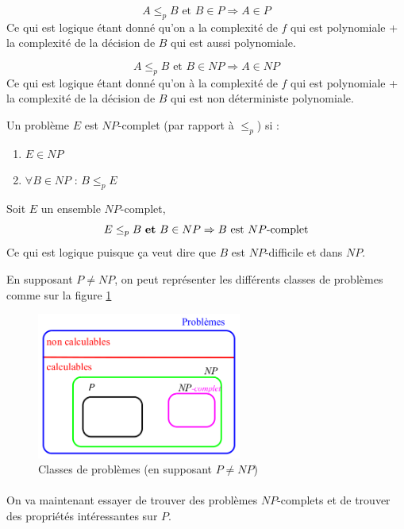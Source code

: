 \begin{myprop}
	\[ A \leq_p B \text{ et } B\in P \Rightarrow A\in P \]
	Ce qui est logique étant donné qu'on a la complexité de $f$ qui est
	polynomiale + la complexité de la décision de $B$ qui est aussi
	polynomiale.
\end{myprop}

\begin{myprop}
	\[ A \leq_p B \text{ et } B\in NP \Rightarrow A\in NP \]
	Ce qui est logique étant donné qu'on à la complexité de $f$ qui est
	polynomiale + la complexité de la décision de $B$ qui est non déterministe
	polynomiale.
\end{myprop}


\begin{mydef}[$NP$-complétude]
	Un problème $E$ est $NP$-complet (par rapport à $\leq_p$) si :
	\begin{enumerate}
		\item $E\in NP$
		\item $\forall B \in NP$ : $B\leq_p E$
	\end{enumerate}
\end{mydef}

\begin{myprop}
	Soit $E$ un ensemble $NP$-complet, \[ E \leq_p B \text{ \textbf{et} } B\in NP \Rightarrow \text{$B$ est $NP$-complet} \]
	Ce qui est logique puisque ça veut dire que $B$ est $NP$-difficile et dans
	$NP$.
\end{myprop}
En supposant $P \ne NP$, on peut représenter les différents classes de problèmes comme sur la figure \ref{fig:classe_prob}
\begin{figure}[h]
	\centering
	\includegraphics[width=0.6\textwidth]{Images/classes_prob.png}
	\caption{Classes de problèmes (en supposant $P \ne NP$)}
	\label{fig:classe_prob}
\end{figure}

\paragraph{} On va maintenant essayer de trouver des problèmes $NP$-complets et de
trouver des propriétés intéressantes sur $P$.

